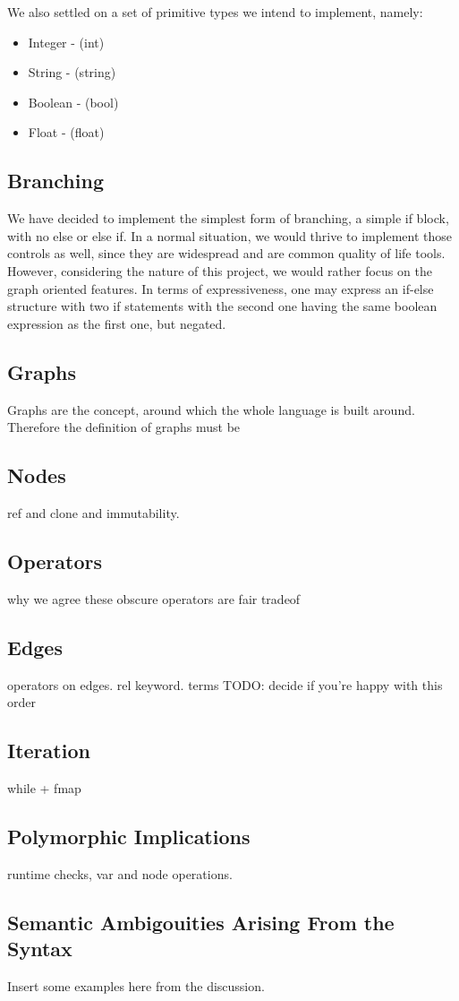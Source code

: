 We also settled on a set of primitive types we intend to implement, namely:
\begin{itemize}
    \item Integer - (int)
    \item String - (string)
    \item Boolean - (bool)
    \item Float - (float)
\end{itemize}

\subsection{Branching}
We have decided to implement the simplest form of branching, a simple if block, with no else or else if.
In a normal situation, we would thrive to implement those controls as well, since they are widespread
and are common quality of life tools.
However, considering the nature of this project, we would rather focus on the graph oriented features.
In terms of expressiveness, one may express an if-else structure with two if statements with the second one having
the same boolean expression as the first one, but negated.

\subsection{Graphs}
Graphs are the concept, around which the whole language is built around. Therefore the definition of graphs
must be 
\subsection{Nodes}
ref and clone and immutability.


\subsection{Operators}
why we agree these obscure operators are fair tradeof

\subsection{Edges}
operators on edges.
rel keyword.
terms
TODO: decide if you're happy with this order


\subsection{Iteration}
while + fmap

\subsection{Polymorphic Implications}
runtime checks, var and node operations.

\subsection{Semantic Ambigouities Arising From the Syntax}
Insert some examples here from the discussion.